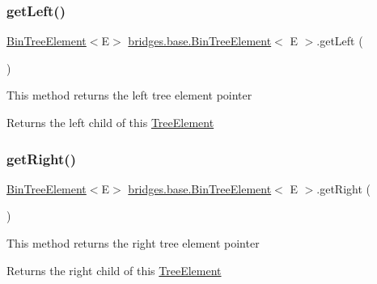 \subsubsection{\texorpdfstring{get\+Left()}{getLeft()}}
{\footnotesize\ttfamily \mbox{\hyperlink{classbridges_1_1base_1_1_bin_tree_element}{Bin\+Tree\+Element}}$<$E$>$ \mbox{\hyperlink{classbridges_1_1base_1_1_bin_tree_element}{bridges.\+base.\+Bin\+Tree\+Element}}$<$ E $>$.get\+Left (\begin{DoxyParamCaption}{ }\end{DoxyParamCaption})}

This method returns the left tree element pointer \begin{DoxyReturn}{Returns}
the left child of this \mbox{\hyperlink{classbridges_1_1base_1_1_tree_element}{Tree\+Element}} 
\end{DoxyReturn}
\mbox{\label{classbridges_1_1base_1_1_bin_tree_element_aa3855c26617ada7248a9d4f83cf455b7}} 
\subsubsection{\texorpdfstring{get\+Right()}{getRight()}}
{\footnotesize\ttfamily \mbox{\hyperlink{classbridges_1_1base_1_1_bin_tree_element}{Bin\+Tree\+Element}}$<$E$>$ \mbox{\hyperlink{classbridges_1_1base_1_1_bin_tree_element}{bridges.\+base.\+Bin\+Tree\+Element}}$<$ E $>$.get\+Right (\begin{DoxyParamCaption}{ }\end{DoxyParamCaption})}

This method returns the right tree element pointer

\begin{DoxyReturn}{Returns}
the right child of this \mbox{\hyperlink{classbridges_1_1base_1_1_tree_element}{Tree\+Element}} 
\end{DoxyReturn}
\mbox{\label{classbridges_1_1base_1_1_bin_tree_element_a5bcc2c1374a49f7ab2523ce53d204c30}} 
